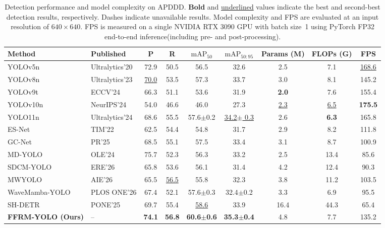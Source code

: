 \documentclass[pdflatex,sn-nature]{sn-jnl}
\begin{document}
\begin{table}[!t]
\caption{Detection performance and model complexity on APDDD. \textbf{Bold} and \underline{underlined} values indicate the best and second-best detection results, respectively. Dashes indicate unavailable results. Model complexity and FPS are evaluated at an input resolution of $640\times640$. FPS is measured on a single NVIDIA RTX 3090 GPU with batch size~1 using PyTorch FP32 end-to-end inference(including pre- and post-processing).}
\label{tab:comparison_apddd}
\centering
\footnotesize
\setlength{\tabcolsep}{1.3pt}
\renewcommand{\arraystretch}{1.12}
\begin{tabular*}{\textwidth}{@{\extracolsep{\fill}}llccccccc@{}}
\toprule
Method & Published & P & R & $\mathrm{mAP}_{50}$ & $\mathrm{mAP}_{50:95}$ & Params (M) & FLOPs (G) & FPS \\
\midrule
YOLOv5n~\cite{Jocher2020YOLOv5} & Ultralytics'20 & 72.9 & 50.5 & 56.5 & 32.6 & 2.5 & 7.1 &\underline{168.6}\\
YOLOv8n~\cite{Jocher2023YOLOv8} & Ultralytics'23 & \underline{70.0} & 53.5 & 57.3 & 33.7 & 3.0 & 8.1 &145.2\\
YOLOv9t~\cite{Wang2024YOLOv9} & ECCV'24 & 66.3 & 51.1 & 53.6 & 31.9 & \textbf{2.0} & 7.6 &155.4\\
YOLOv10n~\cite{Wang2024YOLOv10} & NeurIPS'24 & 54.0 & 46.6 & 46.0 & 27.3 & \underline{2.3} & \underline{6.5} &\textbf{175.5}\\
YOLO11n~\cite{Jocher2024YOLO11} & Ultralytics'24 & 68.6 & 55.5 & 57.6\(\pm\)0.2 & \underline{34.2\(\pm\) 0.3} & 2.6 & \textbf{6.3} &165.8 \\
ES-Net~\cite{Yu2022ESNet} & TIM'22 & 62.5 & 54.4 & 54.8 & 31.7 & 2.9 & 8.2 &111.8\\
GC-Net~\cite{Liu2025GCNet} & PR'25 & 68.5 & 55.1 & 57.5 & 33.4 & 3.1 & 8.7 &100.9\\
MD-YOLO~\cite{Zheng2024MDYOLO} & OLE'24 & 75.7 & 52.3 & 56.3 & 33.2 & 2.5 & 13.4 &85.6\\
SDCM-YOLO~\cite{Deng2026SDCMYOLO} & ERE'26 & 65.8 & 53.6 & 56.1 & 31.4 & 4.2 & 12.4 &90.3\\
MWYOLO~\cite{Chen2026MWYOLO} & AIE'26 & 65.5 & \underline{56.5} & 55.8 & 32.3 & 3.8 & 11.2 &103.5 \\
WaveMamba-YOLO~\cite{Ge2026WaveMambaYOLO} & PLOS ONE'26 & 67.4 & 52.1 & 57.6\(\pm\)0.3 & 32.4\(\pm\)0.2 & 3.3 & 6.9 & 95.5\\
SH-DETR~\cite{Wu2025SHDETR} & PONE'25 & 69.7 & 55.4 & \underline{58.6} & 33.9 & 16.4 & 44.3 &65.4\\
\midrule
\textbf{FFRM-YOLO (Ours)} & -- & \textbf{74.1} & \textbf{56.8} & \textbf{60.6\(\pm\)0.6} & \textbf{35.3\(\pm\)0.4} & 4.8 & 7.7 & 135.2\\
\bottomrule
\end{tabular*}
\end{table}
\end{document}
